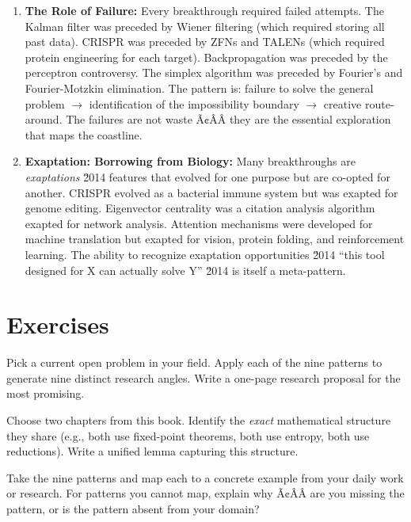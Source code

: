 \begin{enumerate}
\item \textbf{The Role of Failure:} Every breakthrough required failed attempts. The Kalman filter was preceded by Wiener filtering (which required storing all past data). CRISPR was preceded by ZFNs and TALENs (which required protein engineering for each target). Backpropagation was preceded by the perceptron controversy. The simplex algorithm was preceded by Fourier's and Fourier-Motzkin elimination. The pattern is: failure to solve the general problem $\to$ identification of the impossibility boundary $\to$ creative route-around. The failures are not waste Ã¢ÂÂ they are the essential exploration that maps the coastline.

\item \textbf{Exaptation: Borrowing from Biology:} Many breakthroughs are \emph{exaptations} \u2014 features that evolved for one purpose but are co-opted for another. CRISPR evolved as a bacterial immune system but was exapted for genome editing. Eigenvector centrality was a citation analysis algorithm exapted for network analysis. Attention mechanisms were developed for machine translation but exapted for vision, protein folding, and reinforcement learning. The ability to recognize exaptation opportunities \u2014 ``this tool designed for X can actually solve Y'' \u2014 is itself a meta-pattern.
\end{enumerate}

\section{Exercises}
\label{sec:anatomy:exercises}

\begin{exercise}[Basic]
Pick a current open problem in your field. Apply each of the nine patterns to generate nine distinct research angles. Write a one-page research proposal for the most promising.
\end{exercise}

\begin{exercise}[Basic]
Choose two chapters from this book. Identify the \emph{exact} mathematical structure they share (e.g., both use fixed-point theorems, both use entropy, both use reductions). Write a unified lemma capturing this structure.
\end{exercise}

\begin{exercise}[Basic]
Take the nine patterns and map each to a concrete example from your daily work or research. For patterns you cannot map, explain why Ã¢ÂÂ are you missing the pattern, or is the pattern absent from your domain?
\end{exercise}


